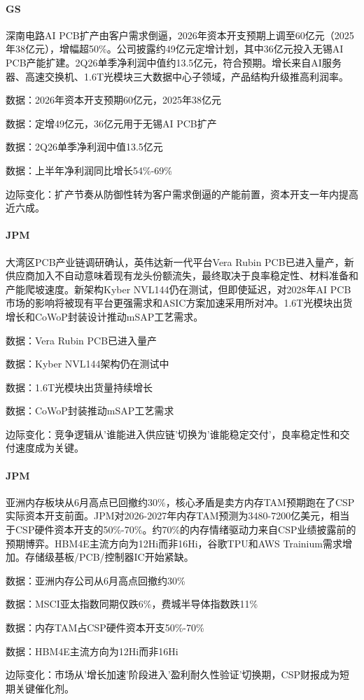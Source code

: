\documentclass[11pt]{ctexart}
\begin{document}
\paragraph{GS} 深南电路AI PCB扩产由客户需求倒逼，2026年资本开支预期上调至60亿元（2025年38亿元），增幅超50\%。公司披露约49亿元定增计划，其中36亿元投入无锡AI PCB产能扩建。2Q26单季净利润中值约13.5亿元，符合预期。增长来自AI服务器、高速交换机、1.6T光模块三大数据中心子领域，产品结构升级推高利润率。
{\small\color{refgray}数据：2026年资本开支预期60亿元，2025年38亿元\par}
{\small\color{refgray}数据：定增49亿元，36亿元用于无锡AI PCB扩产\par}
{\small\color{refgray}数据：2Q26单季净利润中值13.5亿元\par}
{\small\color{refgray}数据：上半年净利润同比增长54\%-69\%\par}
{\small\color{refgray}边际变化：扩产节奏从防御性转为客户需求倒逼的产能前置，资本开支一年内提高近六成。\par}
\paragraph{JPM} 大湾区PCB产业链调研确认，英伟达新一代平台Vera Rubin PCB已进入量产，新供应商加入不自动意味着现有龙头份额流失，最终取决于良率稳定性、材料准备和产能爬坡速度。新架构Kyber NVL144仍在测试，但即使延迟，对2028年AI PCB市场的影响将被现有平台更强需求和ASIC方案加速采用所对冲。1.6T光模块出货增长和CoWoP封装设计推动mSAP工艺需求。
{\small\color{refgray}数据：Vera Rubin PCB已进入量产\par}
{\small\color{refgray}数据：Kyber NVL144架构仍在测试中\par}
{\small\color{refgray}数据：1.6T光模块出货量持续增长\par}
{\small\color{refgray}数据：CoWoP封装推动mSAP工艺需求\par}
{\small\color{refgray}边际变化：竞争逻辑从'谁能进入供应链'切换为'谁能稳定交付'，良率稳定性和交付速度成为关键。\par}
\paragraph{JPM} 亚洲内存板块从6月高点已回撤约30\%，核心矛盾是卖方内存TAM预期跑在了CSP实际资本开支前面。JPM对2026-2027年内存TAM预测为3480-7200亿美元，相当于CSP硬件资本开支的50\%-70\%。约70\%的内存情绪驱动力来自CSP业绩披露前的预期博弈。HBM4E主流方向为12Hi而非16Hi，谷歌TPU和AWS Trainium需求增加。存储级基板/PCB/控制器IC开始紧缺。
{\small\color{refgray}数据：亚洲内存公司从6月高点回撤约30\%\par}
{\small\color{refgray}数据：MSCI亚太指数同期仅跌6\%，费城半导体指数跌11\%\par}
{\small\color{refgray}数据：内存TAM占CSP硬件资本开支50\%-70\%\par}
{\small\color{refgray}数据：HBM4E主流方向为12Hi而非16Hi\par}
{\small\color{refgray}边际变化：市场从'增长加速'阶段进入'盈利耐久性验证'切换期，CSP财报成为短期关键催化剂。\par}
\end{document}
